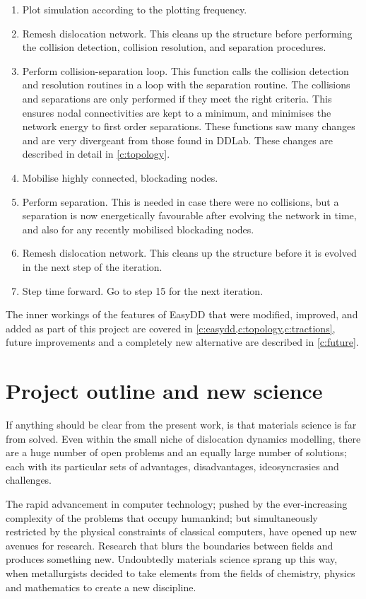 \begin{center}
\begin{enumerate}
        \item Plot simulation according to the plotting frequency.
        \item Remesh dislocation network. This cleans up the structure before performing the collision detection, collision resolution, and separation procedures.
        \item Perform collision-separation loop. This function calls the collision detection and resolution routines in a loop with the separation routine. The collisions and separations are only performed if they meet the right criteria. This ensures nodal connectivities are kept to a minimum, and minimises the network energy to first order separations. These functions saw many changes and are very divergeant from those found in DDLab. These changes are described in detail in \cref{c:topology}.
        \item Mobilise highly connected, blockading nodes.
        \item Perform separation. This is needed in case there were no collisions, but a separation is now energetically favourable after evolving the network in time, and also for any recently mobilised blockading nodes.
        \item Remesh dislocation network. This cleans up the structure before it is evolved in the next step of the iteration.
        \item Step time forward. Go to step 15 for the next iteration.
    \end{enumerate}
\end{center}

The inner workings of the features of EasyDD that were modified, improved, and added as part of this project are covered in \cref{c:easydd,c:topology,c:tractions}, future improvements and a completely new alternative are described in \cref{c:future}.

\section{Project outline and new science}
\label{s:objectives}

If anything should be clear from the present work, is that materials science is far from solved. Even within the small niche of dislocation dynamics modelling, there are a huge number of open problems and an equally large number of solutions; each with its particular sets of advantages, disadvantages, ideosyncrasies and challenges.

The rapid advancement in computer technology; pushed by the ever-increasing complexity of the problems that occupy humankind; but simultaneously restricted by the physical constraints of classical computers, have opened up new avenues for research. Research that blurs the boundaries between fields and produces something new. Undoubtedly materials science sprang up this way, when metallurgists decided to take elements from the fields of chemistry, physics and mathematics to create a new discipline.

